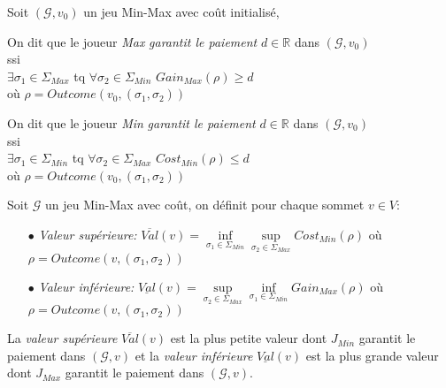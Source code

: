 \begin{defi}$\text{}$\\
	
	Soit $(\mathcal{G}, v_{0})$ un jeu Min-Max avec coût initialisé,
	
	\begin{center}On dit que le joueur \textit{Max} \textit{garantit le paiement} $d \in \mathbb{R}$ dans $(\mathcal{G}, v_{0})$\\ 
		ssi \\ 
	$\exists \sigma _{1} \in \Sigma _{Max}$ tq $\forall \sigma _{2} \in \Sigma _{Min}$ $ Gain_{Max}(\rho) \geq d$\\
	où $ \rho = Outcome(v_{0},(\sigma _{1},\sigma _{2}))$\end{center}
	
	\begin{center} 
		On dit que le joueur \textit{Min} \textit{garantit le paiement} $d \in \mathbb{R}$ dans $(\mathcal{G}, v_{0})$\\		
		ssi	\\
		$\exists \sigma _{1}\in \Sigma _{Min}$ tq $\forall \sigma _{2} \in \Sigma _{Max}$ $ Cost_{Min}(\rho) \leq d$ \\
		où $ \rho = Outcome(v_{0},(\sigma _{1},\sigma _{2}))$
		\end{center}

\end{defi}
		


\begin{defi}
	
	Soit $\mathcal{G}$ un jeu Min-Max avec coût, on définit pour chaque sommet $v \in V$: 
	\begin{enumerate}
		\item[$\bullet$]\textit{Valeur supérieure:} $\overline{Val}(v) = \inf\limits_{\sigma _{1} \in \Sigma _{Min}} \sup\limits_{\sigma _{2} \in \Sigma_{Max}} Cost_{Min}(\rho)$ où $\rho = Outcome(v,(\sigma _{1},\sigma _{2}))$
		
		\item[$\bullet$]\textit{Valeur inférieure:} $\underline{Val}(v) = \sup\limits_{\sigma _{2} \in \Sigma_{Max}}  \inf\limits_{\sigma _{1} \in \Sigma _{Min}} Gain_{Max}(\rho)$  où $\rho = Outcome(v,(\sigma _{1},\sigma _{2}))$
	\end{enumerate}
\end{defi}
\begin{rem}
	La \textit{valeur supérieure}  $\overline{Val}(v)$ est la plus petite valeur dont $J_{Min}$ garantit le paiement dans $(\mathcal{G},v)$ et la \textit{valeur inférieure} $\underline{Val}(v) $ est la plus grande valeur dont $J_{Max}$ garantit le paiement dans $(\mathcal{G},v)$.
\end{rem}

